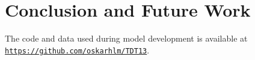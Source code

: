 \section{Conclusion and Future Work}
\label{sec:Conclusion}

\begin{comment}
What are the main contributions? How significant are they?
Discuss the contributions in terms of the initial goal formulated in the Introduction.

Also consider how you think the work could be extended or improved, or what you could have done differently.
\end{comment}

The code and data used during model development is available at \texttt{\url{https://github.com/oskarhlm/TDT13}}.
